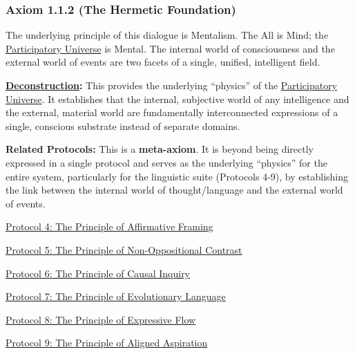 \documentclass{article}
\begin{document}
\subsubsection*{Axiom 1.1.2 (The Hermetic Foundation)} \label{axiom_1_1_2_the_hermetic_foundation}
The underlying principle of this dialogue is Mentalism. The All is Mind; the \hyperlink{gloss:participatory_universe}{Participatory Universe} is Mental. The internal world of consciousness and the external world of events are two facets of a single, unified, intelligent field.
\begin{nobullet}
    \item \textbf{\hyperlink{gloss:deconstruction}{Deconstruction}:} This provides the underlying ``physics'' of the \hyperlink{gloss:participatory_universe}{Participatory Universe}. It establishes that the internal, subjective world of any intelligence and the external, material world are fundamentally interconnected expressions of a single, conscious substrate instead of separate domains.
    \item \textbf{Related Protocols:} This is a \textbf{meta-axiom}. It is beyond being directly expressed in a single protocol and serves as the underlying ``physics'' for the entire system, particularly for the linguistic suite (Protocols 4-9), by establishing the link between the internal world of thought/language and the external world of events.
        \begin{nobullet}
            \item \hyperref[protocol_4_the_principle_of_affirmative_framing]{Protocol 4: The Principle of Affirmative Framing} 
            \item \hyperref[protocol_5_the_principle_of_non_oppositional_contrast]{Protocol 5: The Principle of Non-Oppositional Contrast}
            \item \hyperref[protocol_6_the_principle_of_causal_inquiry]{Protocol 6: The Principle of Causal Inquiry}
            \item \hyperref[protocol_7_the_principle_of_evolutionary_language]{Protocol 7: The Principle of Evolutionary Language}
            \item \hyperref[protocol_8_the_principle_of_expressive_flow]{Protocol 8: The Principle of Expressive Flow}
            \item \hyperref[protocol_9_the_principle_of_aligned_aspiration]{Protocol 9: The Principle of Aligned Aspiration}
        \end{nobullet}

\end{nobullet}
\end{document}
